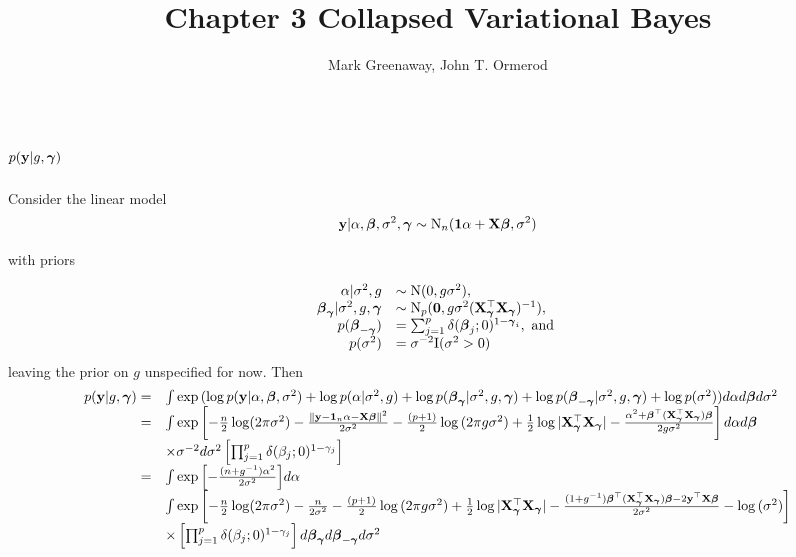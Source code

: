 \documentclass{amsart}[12pt]
\title{Chapter 3 Collapsed Variational Bayes}
\author{Mark Greenaway, John T. Ormerod}
\theoremstyle{definition}
\begin{document}
\section{$p({\bf y} | g, {\boldsymbol \gamma})$}
\noindent Consider the linear model
\[
	{\bf y} | \alpha, {\boldsymbol \beta}, \sigma^2, {\boldsymbol \gamma} \sim \text{N}_n({\bf 1} \alpha + {\bf X} {\boldsymbol \beta}, \sigma^2)
\]

\noindent with priors

$$
\begin{array}{rl}
	\alpha | \sigma^2, g &\sim \text{N}(0, g \sigma^2), \\
	{\boldsymbol \beta}_{\boldsymbol \gamma} | \sigma^2, g, {\boldsymbol \gamma} &\sim \text{N}_p({\bf 0}, g \sigma^2 ({\bf X}_{\boldsymbol \gamma}^\top {\bf X}_{\boldsymbol \gamma})^{-1}), \\
	p({\boldsymbol \beta}_{-{\boldsymbol \gamma}}) &= \sum_{j=1}^p \delta({\boldsymbol \beta}_j; 0)^{1 - {\boldsymbol \gamma}_i}, \text{ and } \\
	p(\sigma^2) &= \sigma^{-2} \text{I}(\sigma^2 > 0)
\end{array}
$$
leaving the prior on $g$ unspecified for now. Then
$$
\begin{array}{rl}
	p({\bf y} | g, {\boldsymbol \gamma}) =&
	\int \exp{(\log p({\bf y}| \alpha, {\boldsymbol\beta}, \sigma^2)
	+ \log p(\alpha | \sigma^2, g)
	+ \log p({\boldsymbol\beta}_{\boldsymbol\gamma}| \sigma^2, g, {\boldsymbol\gamma})
	+ \log p({\boldsymbol\beta}_{-{\boldsymbol\gamma}} | \sigma^2, g, {\boldsymbol\gamma})
	+ \log p(\sigma^2))} d \alpha d {\boldsymbol \beta} d \sigma^2 \\
	=& \int \exp{\left[
	-\frac{n}{2} \log (2 \pi \sigma^2)
	- \frac{\|{\bf y}- {\bf1}_n \alpha - {\bf X}{\boldsymbol\beta}\|^2}{2 \sigma^2} 
	-\frac{(p + 1)}{2} \log{(2\pi g \sigma^2)}
	+ \frac{1}{2} \log{|{\bf X}_{\boldsymbol\gamma}^\top {\bf X}_{\boldsymbol\gamma}|}
	- \frac{\alpha^2 + {\boldsymbol\beta}^\top ({\bf X}_{\boldsymbol\gamma}^\top {\bf X}_{\boldsymbol\gamma}) {\boldsymbol\beta}}{2 g \sigma^{2}} \right] d \alpha d {\boldsymbol\beta}} \\
	&\times \sigma^{-2} d \sigma^2
	\left[ \prod_{j=1}^p \delta(\beta_j; 0)^{1 - \gamma_j} \right] \\
	=& \int \exp{\left[
	-\frac{(n + g^{-1})\alpha^2}{2 \sigma^2} \right]} d \alpha \\
	&  \int \exp{\left[
	-\frac{n}{2} \log (2 \pi \sigma^2)
	-\frac{n}{2 \sigma^2} 
	-\frac{(p + 1)}{2} \log{(2\pi g \sigma^2)}
	+ \frac{1}{2} \log{|{\bf X}_{\boldsymbol\gamma}^\top {\bf X}_{\boldsymbol\gamma}|}
	- \frac{(1 + g^{-1}){\boldsymbol\beta}^\top ({\bf X}_{\boldsymbol\gamma}^\top {\bf X}_{\boldsymbol\gamma}) {\boldsymbol\beta}- 2 {\bf y}^\top {\bf X}{\boldsymbol\beta}}{2 \sigma^{2}}
	-\log{(\sigma^2)}
	\right]}  \\
	&\times \left[ \prod_{j=1}^p \delta(\beta_j; 0)^{1 - \gamma_j} \right] d {\boldsymbol \beta}_{\boldsymbol \gamma} d {\boldsymbol \beta}_{-{\boldsymbol \gamma}} d \sigma^2
\end{array}
$$
\end{document}
